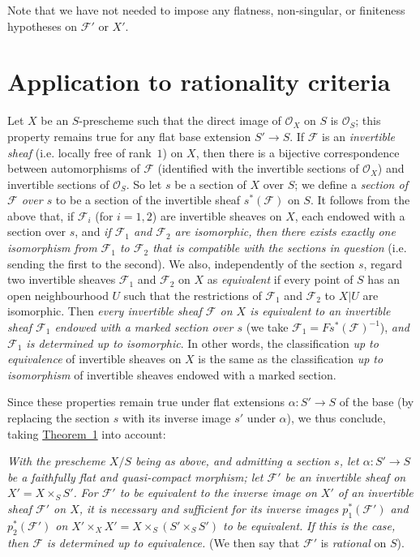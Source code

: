 \documentclass{article}
\newcommand{\scr}[1]{{\mathscr{#1}}}
\renewcommand{\cal}[1]{{\mathcal{#1}}}
\begin{document}
Note that we have not needed to impose any flatness, non-singular, or finiteness hypotheses on $\cal{F}'$ or $X'$.


\section{Application to rationality criteria}
\label{B.4}

Let $X$ be an $S$-prescheme such that the direct image of $\scr{O}_X$ on $S$ is $\scr{O}_S$;
this property remains true for any flat base extension $S'\to S$.
If $\cal{F}$ is an \emph{invertible sheaf} (i.e. locally free of rank~$1$) on $X$, then there is a bijective correspondence between automorphisms of $\cal{F}$ (identified with the invertible sections of $\scr{O}_X$) and invertible sections of $\scr{O}_S$.
So let $s$ be a section of $X$ over $S$;
we define a \emph{section of $\cal{F}$ over $s$} to be a section of the invertible sheaf $s^*(\cal{F})$ on $S$.
It follows from the above that, if $\cal{F}_i$ (for $i=1,2$) are invertible sheaves on $X$, each endowed with a section over $s$, and \emph{if $\cal{F}_1$ and $\cal{F}_2$ are isomorphic, then there exists exactly one isomorphism from $\cal{F}_1$ to $\cal{F}_2$ that is compatible with the sections in question} (i.e. sending the first to the second).
We also, independently of the section $s$, regard two invertible sheaves $\cal{F}_1$ and $\cal{F}_2$ on $X$ as \emph{equivalent} if every point of $S$ has an open neighbourhood $U$ such that the restrictions of $\cal{F}_1$ and $\cal{F}_2$ to $X|U$ are isomorphic.
Then \emph{every invertible sheaf $\cal{F}$ on $X$ is equivalent to an invertible sheaf $\cal{F}_1$ endowed with a marked section over $s$} (we take $\cal{F}_1=Fs^*(\cal{F})^{-1}$), \emph{and $\cal{F}_1$ is determined up to isomorphic}.
In other words, the classification \emph{up to equivalence} of invertible sheaves on $X$ is the same as the classification \emph{up to isomorphism} of invertible sheaves endowed with a marked section.

Since these properties remain true under flat extensions $\alpha\colon S'\to S$ of the base (by replacing the section $s$ with its inverse image $s'$ under $\alpha$), we thus conclude, taking \hyperref[theorem:B.1(1)]{Theorem~1} into account:

\emph{With the prescheme $X/S$ being as above, and admitting a section $s$, let $\alpha\colon S'\to S$ be a faithfully flat and quasi-compact morphism; let $\cal{F}'$ be an invertible sheaf on $X'=X\times_S S'$.}
\emph{For $\cal{F}'$ to be equivalent to the inverse image on $X'$ of an invertible sheaf $\cal{F}'$ on $X$, it is necessary and sufficient for its inverse images $p_1^*(\cal{F}')$ and $p_2^*(\cal{F}')$ on $X'\times_X X'=X\times_S(S'\times_S S')$ to be equivalent.}
\emph{If this is the case, then $\cal{F}$ is determined up to equivalence.}
(We then say that $\cal{F}'$ is \emph{rational} on $S$).
\end{document}
